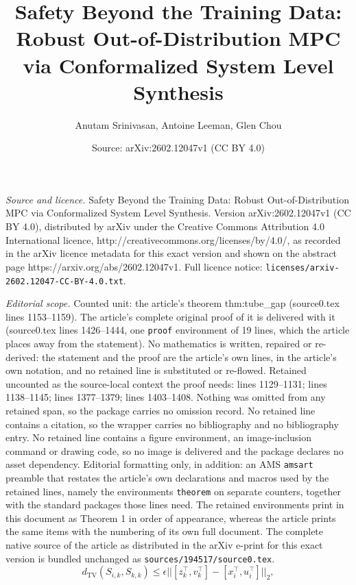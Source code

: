 \documentclass[10pt,a4paper]{amsart}
\title{Safety Beyond the Training Data: Robust Out-of-Distribution MPC via Conformalized System Level Synthesis}
\author{Anutam Srinivasan, Antoine Leeman, Glen Chou}
\date{Source: arXiv:2602.12047v1 (CC BY 4.0)}
\newcommand{\T}{^\top}
\newcommand{\tvd}{d_\textrm{TV}}
\begin{document}
\maketitle

\noindent\emph{Source and licence.} Safety Beyond the Training Data: Robust Out-of-Distribution MPC via Conformalized System Level Synthesis. Version arXiv:2602.12047v1 (CC BY 4.0), distributed by arXiv under the Creative Commons Attribution 4.0 International licence, http://creativecommons.org/licenses/by/4.0/, as recorded in the arXiv licence metadata for this exact version and shown on the abstract page https://arxiv.org/abs/2602.12047v1. Full licence notice: \texttt{licenses/arxiv-2602.12047-CC-BY-4.0.txt}.\par\smallskip

\noindent\textit{Editorial scope.} Counted unit: the article's theorem thm:tube\_gap (source0.tex lines 1153--1159). The article's complete original proof of it is delivered with it (source0.tex lines 1426--1444, one \texttt{proof} environment of 19 lines, which the article places away from the statement). No mathematics is written, repaired or re-derived: the statement and the proof are the article's own lines, in the article's own notation, and no retained line is substituted or re-flowed.  Retained uncounted as the source-local context the proof needs: lines 1129--1131; lines 1138--1145; lines 1377--1379; lines 1403--1408.  Nothing was omitted from any retained span, so the package carries no omission record.  No retained line contains a citation, so the wrapper carries no bibliography and no bibliography entry.  No retained line contains a figure environment, an image-inclusion command or drawing code, so no image is delivered and the package declares no asset dependency.  Editorial formatting only, in addition: an AMS \texttt{amsart} preamble that restates the article's own declarations and macros used by the retained lines, namely the environments \texttt{theorem} on separate counters, together with the standard packages those lines need.  The retained environments print in this document as Theorem 1 in order of appearance, whereas the article prints the same items with the numbering of its own full document.  The complete native source of the article as distributed in the arXiv e-print for this exact version is bundled unchanged as \texttt{sources/194517/source0.tex}.
\begin{equation}\label{eq:lipschitz}
\tvd( S_{i,k},S_{k,k}) \leq  \epsilon ||[z_k\T,v_k\T] - [x_i\T,u_i\T]||_{2},    
\end{equation}
\end{document}
